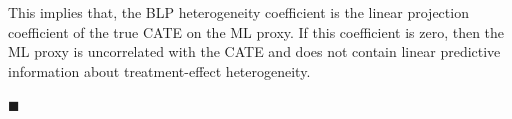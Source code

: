 \documentclass[11pt]{article}
\begin{document}
This implies that, the BLP heterogeneity coefficient is the linear projection coefficient of the true CATE on the ML proxy. If this coefficient is zero, then the ML proxy is uncorrelated with the CATE and does not contain linear predictive information about treatment-effect heterogeneity.

\hfill $\blacksquare$

\newpage


\end{document}
